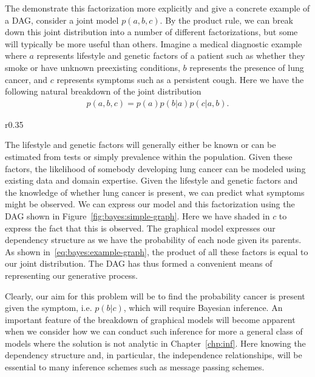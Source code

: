 The demonstrate this factorization more explicitly and give a concrete example of a DAG, consider a joint model
$p(a,b,c)$.  By the product rule, we can break down this joint distribution into a number of different
factorizations, but some will typically be more useful than others.  Imagine a medical diagnostic
example where $a$ represents lifestyle and genetic factors of a patient such as whether they smoke
or have unknown preexisting conditions, 
$b$ represents the presence of lung cancer, and $c$ represents symptoms 
such as a persistent cough.  Here we have the following natural breakdown of the joint distribution
\begin{align}
\label{eq:bayes:example-graph}
p(a,b,c) = p(a) p(b|a) p(c|a,b).
\end{align}
\begin{wrapfigure}{r}{0.35\textwidth}
	\vspace{-12pt}
	\centering 
	\resizebox{.32\textwidth}{!}{
		
	}
	\caption{Simple example DAG corresponding to~\eqref{eq:bayes:example-graph}
		\label{fig:bayes:simple-graph}}
	\vspace{-10pt}
\end{wrapfigure}
The lifestyle and genetic factors will generally either be known or can be estimated from tests or
simply prevalence within the population.  Given these factors, the likelihood of somebody developing
lung cancer can be modeled using existing data and domain expertise.   Given the lifestyle and
genetic factors and the knowledge of whether lung cancer is present, we can predict what
symptoms might be observed.  We can express our model and this factorization using
the DAG shown in Figure~\ref{fig:bayes:simple-graph}.
  Here we have shaded in $c$ to express the fact that this is
observed.  The graphical model expresses our dependency structure as we have the probability
of each node given its parents.  As shown in~\eqref{eq:bayes:example-graph}, the product of
all these factors is equal to our joint distribution.  The DAG has thus formed a convenient means
of representing our generative process.

Clearly, our aim for this problem will be to find the probability cancer is present given
the symptom, i.e. $p(b|c)$, which will
require Bayesian inference.
An important feature of the breakdown of graphical models will become apparent when we
consider how we can conduct such inference for more a general class of 
models where the solution is not analytic in Chapter~\ref{chp:inf}.  Here knowing the dependency
structure and, in particular, the independence relationships, will be essential to many inference 
schemes such as message passing schemes.

